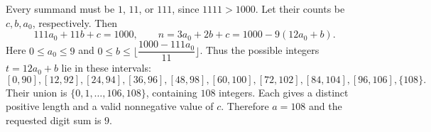 Every summand must be $1$, $11$, or $111$, since $1111>1000$. Let their counts be $c,b,a_0$, respectively. Then
\[
111a_0+11b+c=1000,\qquad
n=3a_0+2b+c=1000-9(12a_0+b).
\]
Here $0\le a_0\le9$ and $0\le b\le\lfloor\dfrac{1000-111a_0}{11}\rfloor$. Thus the possible integers $t=12a_0+b$ lie in these intervals:
\[
[0,90],[12,92],[24,94],[36,96],[48,98],
[60,100],[72,102],[84,104],[96,106],\{108\}.
\]
Their union is $\{0,1,\ldots,106,108\}$, containing $108$ integers. Each gives a distinct positive length and a valid nonnegative value of $c$. Therefore $a=108$ and the requested digit sum is $\boxed9$.
